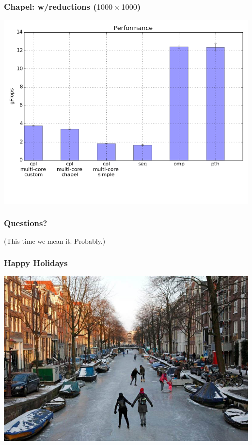 \documentclass{beamer}
\begin{document}
\begin{frame}
 \frametitle{Chapel: w/reductions ($1000 \times 1000$)}
 \includegraphics[width=\textwidth]{../cpl/report/per_with_reductions.png}
\end{frame}

\begin{frame}
 \frametitle{Questions?}
 (This time we mean it. Probably.)
\end{frame}

\begin{frame}
 \frametitle{Happy Holidays}
 \includegraphics[width=\textwidth]{ice-skating-amsterdam-frozen-canals-netherlands-holland-7.jpg}
\end{frame}
\end{document}
